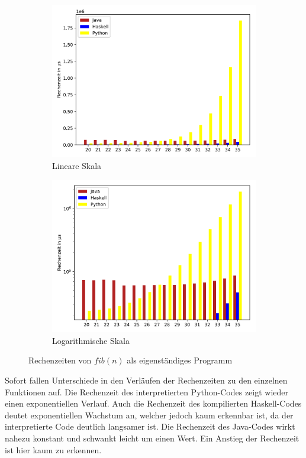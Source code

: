 \documentclass[11pt, parskip=half]{scrartcl}       %
\begin{document}
\begin{figure}[h]
  \centering
  \begin{subfigure}{0.5\textwidth}
    \centering
    \includegraphics[width=\textwidth]{src/linear-standalone.pdf}
    \caption{Lineare Skala}
    \label{fig:bench-lin}
  \end{subfigure}%
  \begin{subfigure}{0.5\textwidth}
    \centering
    \includegraphics[width=\textwidth]{src/log-standalone.pdf}
    \caption{Logarithmische Skala}
    \label{fig:bench-log}
  \end{subfigure}
  \caption{Rechenzeiten von $fib(n)$ als eigenständiges Programm}
  \label{fig:bench}
\end{figure}


Sofort fallen Unterschiede in den Verläufen der Rechenzeiten zu den einzelnen Funktionen auf.
Die Rechenzeit des interpretierten Python-Codes zeigt wieder einen exponentiellen Verlauf.
Auch die Rechenzeit des kompilierten Haskell-Codes deutet exponentiellen Wachstum an, welcher jedoch kaum erkennbar ist, da der interpretierte Code deutlich langsamer ist.
Die Rechenzeit des Java-Codes wirkt nahezu konstant und schwankt leicht um einen Wert.
Ein Anstieg der Rechenzeit ist hier kaum zu erkennen.
\end{document}

